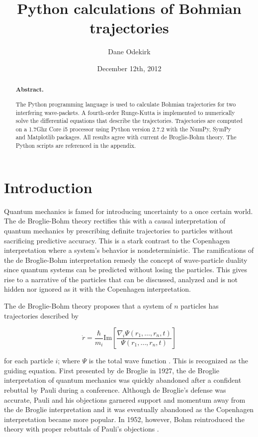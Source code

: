 \documentclass[10pt, reqno]{article}
\title{Python calculations of Bohmian trajectories}
\author{Dane Odekirk}
\date{December 12th, 2012}
\begin{document}
 
\maketitle 
\pagebreak

\begin{abstract}
  \noindent 
  {\bf Abstract. } 

  The Python programming language is used to calculate Bohmian trajectories for two interfering wave-packets. 
  A fourth-order Runge-Kutta is implemented to numerically solve the differential equations that describe the trajectories.
  Trajectories are computed on a 1.7Ghz Core i5 processor using Python version 2.7.2 with the NumPy, SymPy and Matplotlib packages.
  All results agree with current de Broglie-Bohm theory.
  The Python scripts are referenced in the appendix.

\end{abstract}




\section{Introduction}

  Quantum mechanics is famed for introducing uncertainty to a once certain world.
  The de Broglie-Bohm theory rectifies this with a causal interpretation of quantum mechanics by 
    prescribing definite trajectories to particles without sacrificing predictive accuracy.
  This is a stark contrast to the Copenhagen interpretation where a system's behavior is nondeterministic.  
  The ramifications of the de Broglie-Bohm interpretation remedy the concept of wave-particle duality since
    quantum systems can be predicted without losing the particles.
  This gives rise to a narrative of the particles that can be discussed, analyzed and is not hidden nor ignored as it with 
    the Copenhagen interpretation.

  The de Broglie-Bohm theory proposes that a system of $n$ particles has trajectories described by 

  \begin{equation} \label{eq:trajectories}
    \dot{r} = \frac{\hbar}{m_i}\text{Im}[\frac{ \nabla_{i} \Psi(r_1,\dots,r_n,t)}{\Psi(r_1, \dots, r_n, t) } ]
  \end{equation}

  \noindent
  for each particle $i$; where $\Psi$ is the total wave function \cite{guay}.
  This is recognized as the guiding equation.
  First presented by de Broglie in 1927, the de Broglie interpretation of quantum mechanics was quickly abandoned after a confident rebuttal by Pauli during a conference.
  Although de Broglie's defense was accurate, Pauli and his objections garnered support and momentum away from the de Broglie interpretation
    and it was eventually abandoned as the Copenhagen interpretation became more popular.
  In 1952, however, Bohm reintroduced the theory with proper rebuttals of Pauli's objections \cite{bohm}.
\end{document}
